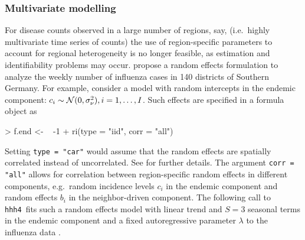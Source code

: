 \documentclass[a4paper,11pt]{article}
\newcommand{\n}{{\cal N}}
\newcommand{\code}[1]{\texttt{#1}}
\newcommand{\hhh}{\texttt{hhh4}}
\begin{document}
\subsubsection{Multivariate modelling}

For disease counts observed in a large number of regions, say, (i.e.\
highly multivariate time series of counts) the use of region-specific 
parameters to account for regional heterogeneity is no longer feasible, 
as estimation and identifiability problems may occur. 
\cite{paul-held-2011} propose a random effects formulation to analyze the weekly
number of influenza cases in 140 districts of Southern Germany.
For example, consider a model with random intercepts in the endemic component: 
$c_i \sim \n(0,\sigma^2_\nu), i=1,\ldots,I$.
Such effects are specified in a formula object as
\begin{Schunk}
\begin{Sinput}
> f.end <- ~ -1 + ri(type = "iid", corr = "all")
\end{Sinput}
\end{Schunk}
Setting \code{type = "car"} would assume that the random effects are spatially 
correlated instead of uncorrelated. See \cite{paul-held-2011} for further details.
The argument \code{corr = "all"} allows for correlation between region-specific 
random effects in different components, e.g.\ random incidence levels $c_i$ 
in the endemic component and random effects $b_i$ in the neighbor-driven component.
The following call to \hhh\ fits such a random effects model with
linear trend and $S=3$ seasonal terms in the endemic component and
a fixed autoregressive parameter $\lambda$ to the influenza data 
\citep[cf. model B2 in Tab.~3 in][]{paul-held-2011}.
\end{document}
